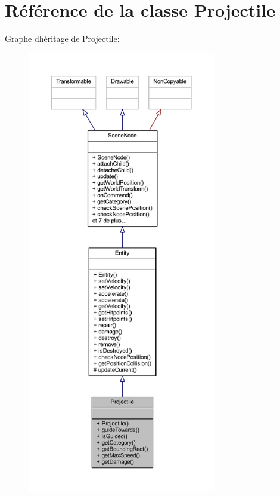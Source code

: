 \hypertarget{class_projectile}{}\section{Référence de la classe Projectile}
\label{class_projectile}


Graphe d\textquotesingle{}héritage de Projectile\+:\nopagebreak
\begin{figure}[H]
\begin{center}
\leavevmode
\includegraphics[height=550pt]{class_projectile__inherit__graph}
\end{center}
\end{figure}


